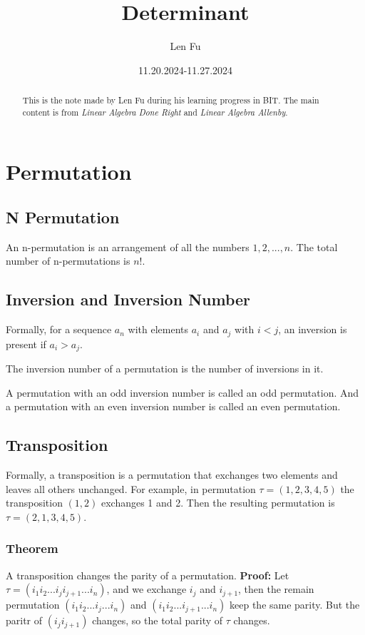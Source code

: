 \documentclass{article}
\title{Determinant}
\author{Len Fu}
\date{11.20.2024-11.27.2024}
\theoremstyle{definition}
\begin{document}
\maketitle

\begin{abstract}
    This is the note made by Len Fu during his learning progress in BIT.
    The main content is from \textit{Linear Algebra Done Right} and \textit{Linear Algebra Allenby}.
\end{abstract}

\tableofcontents
\newpage

\section{Permutation}

\subsection{N Permutation}
An n-permutation is an arrangement of all the numbers $1,2,...,n$.
The total number of n-permutations is $n!$.
\subsection{Inversion and Inversion Number}
Formally, for a sequence ${a_{n}}$ with elements 
$a_{i}$ and $a_{j}$ with $i<j$, an inversion is 
present if $a_{i}>a_{j}$.

The inversion number of a permutation is the number of inversions in it.

A permutation with an odd inversion number is called 
an odd permutation. And a permutation with an even inversion number 
is called an even permutation.

\subsection{Transposition}
Formally, a transposition is a permutation that 
exchanges two elements and leaves all others unchanged.
For example, in permutation $\tau=(1,2,3,4,5)$ the 
transposition $(1,2)$ exchanges 1 and 2.
Then the resulting permutation is $\tau=(2,1,3,4,5)$.

\subsubsection{Theorem}
A transposition changes the parity of a permutation.
\textbf{Proof:}\newline
Let $\tau = (i_{1}i_{2}...i_{j}i_{j+1}...i_{n})$, and 
we exchange $i_{j}$ and $i_{j+1}$, then the remain permutation 
$(i_{1}i_{2}...i_{j}...i_{n})$ and $(i_{1}i_{2}...i_{j+1}...i_{n})$ 
keep the same parity. But the paritr of $(i_{j}i_{j+1})$ changes,
so the total parity of $\tau$ changes.
\end{document}
